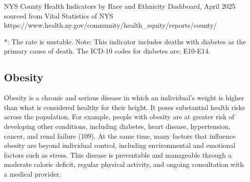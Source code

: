 \documentclass[
  english,
  letterpaper,
]{report}
\begin{document}
\begin{tcolorbox}[enhanced jigsaw, breakable, leftrule=.75mm, title=\textcolor{quarto-callout-note-color}{\faInfo}\hspace{0.5em}{Source}, bottomrule=.15mm, opacityback=0, left=2mm, colback=white, bottomtitle=1mm, coltitle=black, colbacktitle=quarto-callout-note-color!10!white, colframe=quarto-callout-note-color-frame, opacitybacktitle=0.6, toptitle=1mm, titlerule=0mm, arc=.35mm, rightrule=.15mm, toprule=.15mm]

NYS County Health Indicators by Race and Ethnicity Dashboard, April 2025
sourced from Vital Statistics of NYS
https://www.health.ny.gov/community/health\_equity/reports/county/

\end{tcolorbox}

\begin{tcolorbox}[enhanced jigsaw, breakable, leftrule=.75mm, title=\textcolor{quarto-callout-note-color}{\faInfo}\hspace{0.5em}{Note}, bottomrule=.15mm, opacityback=0, left=2mm, colback=white, bottomtitle=1mm, coltitle=black, colbacktitle=quarto-callout-note-color!10!white, colframe=quarto-callout-note-color-frame, opacitybacktitle=0.6, toptitle=1mm, titlerule=0mm, arc=.35mm, rightrule=.15mm, toprule=.15mm]

*: The rate is unstable. Note: This indicator includes deaths with
diabetes as the primary cause of death. The ICD-10 codes for diabetes
are: E10-E14.

\end{tcolorbox}

\subsection{Obesity}\label{obesity}

Obesity is a chronic and serious disease in which an individual's weight
is higher than what is considered healthy for their height. It poses
substantial health risks across the population. For example, people with
obesity are at greater risk of developing other conditions, including
diabetes, heart disease, hypertension, cancer, and renal failure (109).
At the same time, many factors that influence obesity are beyond
individual control, including environmental and emotional factors such
as stress. This disease is preventable and manageable through a moderate
caloric deficit, regular physical activity, and ongoing consultation
with a medical provider.
\end{document}

